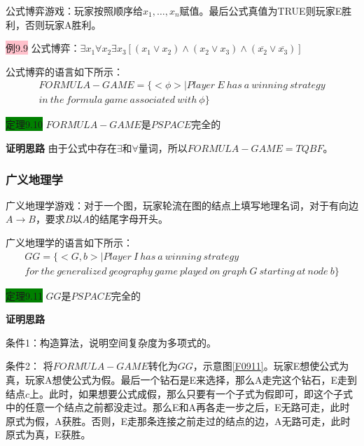 \documentclass[a4paper]{article}
\begin{document}
	公式博弈游戏：玩家按照顺序给$x_1,\dots,x_n$赋值。最后公式真值为TRUE则玩家E胜利，否则玩家A胜利。

	\colorbox{pink}{例9.9} 公式博弈：$\exists x_1 \forall x_2 \exists x_3[(x_1 \vee x_2) \land (x_2 \vee x_3) \land (\overline{x_2} \vee \overline{x_3})]$

	公式博弈的语言如下所示：
	\begin{multline}
		FORMULA-GAME=\{<\phi>|Player~E~has~a~winning~strategy \\
		in~the~formula~game~associated~with~\phi\}
	\end{multline}

	\colorbox{green}{定理9.10} $FORMULA-GAME$是$PSPACE$完全的
	
	\textbf{证明思路} \quad 由于公式中存在$\exists$和$\forall$量词，所以$FORMULA-GAME=TQBF$。

\subsubsection{广义地理学}

	广义地理学游戏：对于一个图，玩家轮流在图的结点上填写地理名词，对于有向边$A \rightarrow B$，要求$B$以$A$的结尾字母开头。

	广义地理学的语言如下所示：
	\begin{multline}
		GG=\{<G,b>|Player~I~has~a~winning~strategy \\
		for~the~generalized~geography~game~played~on~graph~G~starting~at~node~b\}
	\end{multline}

	\colorbox{green}{定理9.11} $GG$是$PSPACE$完全的

	\textbf{证明思路}
		
		\qquad 条件1：构造算法，说明空间复杂度为多项式的。
		
		\qquad 条件2： 将$FORMULA-GAME$转化为$GG$，示意图\ref{F0911}。玩家E想使公式为真，玩家A想使公式为假。最后一个钻石是E来选择，那么A走完这个钻石，E走到结点$c$上。此时，如果想要公式成假，那么只要有一个子式为假即可，即这个子式中的任意一个结点之前都没走过。那么E和A再各走一步之后，E无路可走，此时原式为假，A获胜。否则，E走那条连接之前走过的结点的边，A无路可走，此时原式为真，E获胜。
\end{document}

